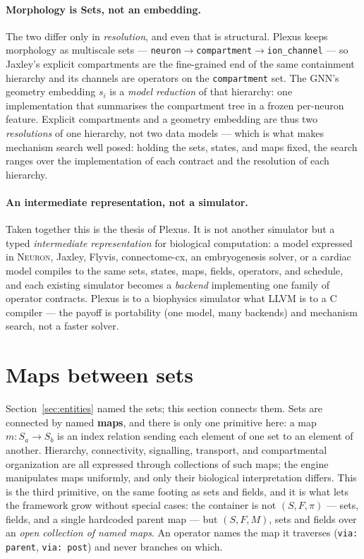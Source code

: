 \documentclass[11pt]{article}
\newcommand{\code}[1]{\texttt{#1}}
\begin{document}
\paragraph{Morphology is Sets, not an embedding.} The two differ only in
\emph{resolution}, and even that is structural. Plexus keeps morphology as multiscale
sets --- \code{neuron}$\to$\code{compartment}$\to$\code{ion\_channel} --- so Jaxley's
explicit compartments are the fine-grained end of the same containment hierarchy and
its channels are operators on the \code{compartment} set. The GNN's geometry
embedding $s_i$ is a \emph{model reduction} of that hierarchy: one implementation that
summarises the compartment tree in a frozen per-neuron feature. Explicit compartments
and a geometry embedding are thus two \emph{resolutions} of one hierarchy, not two
data models --- which is what makes mechanism search well posed: holding the sets,
states, and maps fixed, the search ranges over the implementation of each contract
and the resolution of each hierarchy.

\paragraph{An intermediate representation, not a simulator.} Taken together this is
the thesis of Plexus. It is not another simulator but a typed \emph{intermediate
representation} for biological computation: a model expressed in \textsc{Neuron},
Jaxley, Flyvis, connectome-cx, an embryogenesis solver, or a cardiac model compiles
to the same sets, states, maps, fields, operators, and schedule, and each existing
simulator becomes a \emph{backend} implementing one family of operator contracts.
Plexus is to a biophysics simulator what \textsc{LLVM} is to a C compiler --- the
payoff is portability (one model, many backends) and mechanism search, not a faster
solver.

\section{Maps between sets}
\label{sec:graph}

Section~\ref{sec:entities} named the sets; this section connects them. Sets are
connected by named \textbf{maps}, and there is only one primitive here: a map
$m:S_a\to S_b$ is an index relation sending each element of one set to an element of
another. Hierarchy, connectivity, signalling, transport, and compartmental
organization are all expressed through collections of such maps; the engine
manipulates maps uniformly, and only their biological interpretation differs. This is
the third primitive, on the same footing as sets and fields, and it is what lets the
framework grow without special cases: the container is not $(S,F,\pi)$ --- sets,
fields, and a single hardcoded parent map --- but $(S,F,M)$, sets and fields over an
\emph{open collection of named maps}. An operator names the map it traverses
(\code{via: parent}, \code{via: post}) and never branches on which.
\end{document}
